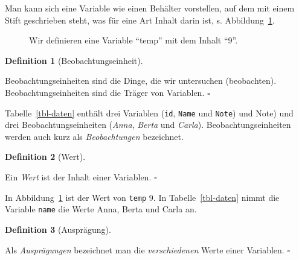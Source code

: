 \documentclass[
  letterpaper,
  twoside,
  open=any]{scrbook}
\theoremstyle{definition}
\theoremstyle{definition}
\theoremstyle{definition}
\newtheorem{definition}{Definition}[chapter]
\theoremstyle{remark}
\begin{document}
Man kann sich eine Variable wie einen Behälter vorstellen, auf dem mit
einem Stift geschrieben steht, was für eine Art Inhalt darin ist, s.
Abbildung~\ref{fig-var-zuweisen}.

\begin{figure}


\caption{\label{fig-var-zuweisen}Wir definieren eine Variable
\enquote{temp} mit dem Inhalt \enquote{9}.}

\end{figure}%

\begin{definition}[Beobachtungseinheit]\protect\hypertarget{def-beobeinheit}{}\label{def-beobeinheit}

Beobachtungseinheiten sind die Dinge, die wir untersuchen (beobachten).
Beobachtungseinheiten sind die Träger von Variablen. \(\square\)

\end{definition}

Tabelle~\ref{tbl-daten} enthält drei Variablen (\texttt{id},
\texttt{Name} und \texttt{Note}) und Note) und drei
Beobachtungseinheiten (\emph{Anna}, \emph{Berta} und \emph{Carla}).
Beobachtungseinheiten werden auch kurz als \emph{Beobachtungen}
bezeichnet.

\begin{definition}[Wert]\protect\hypertarget{def-wert}{}\label{def-wert}

Ein \emph{Wert} ist der Inhalt einer Variablen. \(\square\)

\end{definition}

In Abbildung~\ref{fig-var-zuweisen} ist der Wert von \texttt{temp} 9. In
Tabelle~\ref{tbl-daten} nimmt die Variable \texttt{name} die Werte Anna,
Berta und Carla an.

\begin{definition}[Ausprägung]\protect\hypertarget{def-auspraegung}{}\label{def-auspraegung}

Als \emph{Ausprägungen} bezeichnet man die \emph{verschiedenen} Werte
einer Variablen. \(\square\)

\end{definition}
\end{document}
